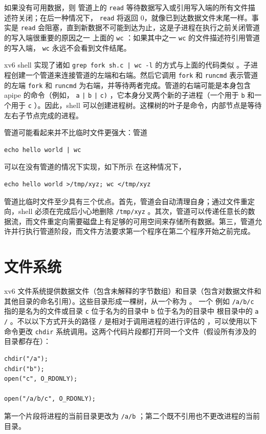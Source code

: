如果没有可用数据，则
 管道上的    \lstinline{read}    等待数据写入或引用写入端的所有文件描述符关闭；在后一种情况下，
    \lstinline{read}    将返回 0，就像已到达数据文件末尾一样。事实是
    \lstinline{read}    会阻塞，直到新数据不可能到达为止，这是子进程在执行之前关闭管道的写入端很重要的原因之一
 上面的    \lstinline{wc}   ：如果其中之一
    \lstinline{wc}    的文件描述符引用管道的写入端，
    \lstinline{wc}    永远不会看到文件结尾。  

xv6 shell 实现了诸如
    \lstinline{grep fork sh.c | wc -l}    的方式与上面的代码类似
        。子进程创建一个管道来连接管道的左端和右端。然后它调用
    \lstinline{fork}    和
    \lstinline{runcmd}    表示管道的左端
    \lstinline{fork}    和
    \lstinline{runcmd}    为右端，并等待两者完成。管道的右端可能是本身包含 apipe 的命令（例如，
    \lstinline{a}   
    \lstinline{|}   
    \lstinline{b}   
    \lstinline{|}   
    \lstinline{c)}    ，它本身分叉两个新的子进程（一个用于
    \lstinline{b}    和一个用于
    \lstinline{c}    ）。因此，shell 可以创建进程树。这棵树的叶子是命令，内部节点是等待左右子节点完成的进程。  

管道可能看起来并不比临时文件更强大：管道
\begin{lstlisting}[]
echo hello world | wc
\end{lstlisting}    可以在没有管道的情况下实现，如下所示
 在这种情况下，   
 \begin{lstlisting}[]
 echo hello world >/tmp/xyz; wc </tmp/xyz
\end{lstlisting}    
管道比临时文件至少具有三个优点。首先，管道会自动清理自身；通过文件重定向，shell 必须在完成后小心地删除
     \lstinline{/tmp/xyz}   。其次，管道可以传递任意长的数据流，而文件重定向需要磁盘上有足够的可用空间来存储所有数据。第三，管道允许并行执行管道阶段，而文件方法要求第一个程序在第二个程序开始之前完成。
    \section{文件系统  }     

xv6 文件系统提供数据文件（包含未解释的字节数组）和目录（包含对数据文件和其他目录的命名引用）。这些目录形成一棵树，从一个称为
        。 一个
        例如
    \lstinline{/a/b/c}    指的是名为的文件或目录
    \lstinline{c}    位于名为的目录中
    \lstinline{b}    位于名为的目录中
 根目录中的    \lstinline{a}   
    \lstinline{/}   。不以以下方式开头的路径
    \lstinline{/}    是相对于调用进程的进行评估的
        ，可以使用以下命令更改
    \lstinline{chdir}    系统调用。这两个代码片段都打开同一个文件（假设所有涉及的目录都存在）：
\begin{lstlisting}[]
chdir("/a");
chdir("b");
open("c", O_RDONLY);

open("/a/b/c", O_RDONLY);
\end{lstlisting}    第一个片段将进程的当前目录更改为
    \lstinline{/a/b}    ；第二个既不引用也不更改进程的当前目录。  

